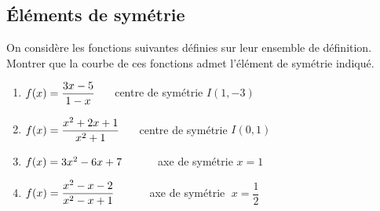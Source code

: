 



 \summary{}
 
	\subsection*{Éléments de symétrie}
\begin{exercice}
On considère les fonctions suivantes définies sur leur ensemble
de définition. Montrer que  la courbe de ces fonctions admet l'élément de symétrie indiqué.
\begin{enumerate}
\item $f(x)= \dfrac{3x-5}{1-x}\hspace*{0.5cm}$  centre de symétrie $ I(1, -3) $

\item $f(x)= \dfrac{x^2+2x+1}{x^2+1}\hspace*{0.5cm}$ centre de symétrie $ I(0, 1) $

\item $f(x)=3x^2 - 6x + 7\hspace*{1cm}$ axe de symétrie $ x=1 $

\item $f(x)=\dfrac{x^2 - x -2}{x^2 - x + 1}\hspace*{1cm}$ axe de symétrie $\; x=\dfrac{1}{2} $
\end{enumerate}
\end{exercice}
